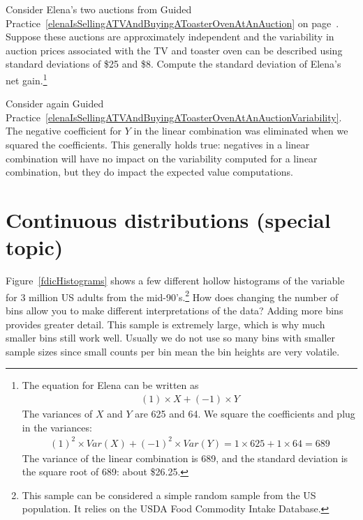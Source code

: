 \begin{exercise}\label{elenaIsSellingATVAndBuyingAToasterOvenAtAnAuctionVariability}
Consider Elena's two auctions from Guided Practice~\ref{elenaIsSellingATVAndBuyingAToasterOvenAtAnAuction} on page~\pageref{elenaIsSellingATVAndBuyingAToasterOvenAtAnAuction}. Suppose these auctions are approximately independent and the variability in auction prices associated with the TV and toaster oven can be described using standard deviations of \$25 and \$8. Compute the standard deviation of Elena's net gain.\footnote{The equation for Elena can be written as
\begin{align*}
(1)\times X + (-1)\times Y
\end{align*}
The variances of $X$ and $Y$ are 625 and 64. We square the coefficients and plug in the variances:
\begin{align*}
(1)^2\times Var(X) + (-1)^2\times Var(Y) = 1\times 625 + 1\times 64 = 689
\end{align*}
The variance of the linear combination is 689, and the standard deviation is the square root of 689: about \$26.25.}
\end{exercise}

Consider again Guided Practice~\ref{elenaIsSellingATVAndBuyingAToasterOvenAtAnAuctionVariability}. The negative coefficient for $Y$ in the linear combination was eliminated when we squared the coefficients. This generally holds true: negatives in a linear combination will have no impact on the variability computed for a linear combination, but they do impact the expected value computations.


\section{Continuous distributions (special topic)}
\label{contDist}

\begin{example}{Figure~\ref{fdicHistograms} shows a few different hollow histograms of the variable  for 3 million US adults from the mid-90's.\footnote{This sample can be considered a simple random sample from the US population. It relies on the USDA Food Commodity Intake Database.} How does changing the number of bins allow you to make different interpretations of the data?}\label{usHeights}
Adding more bins provides greater detail. This sample is extremely large, which is why much smaller bins still work well. Usually we do not use so many bins with smaller sample sizes since small counts per bin mean the bin heights are very volatile.
\end{example}

